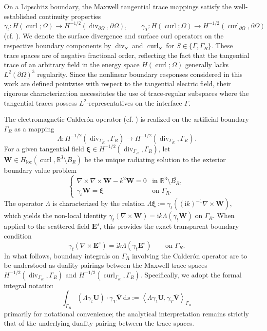 \documentclass[10pt,a4paper]{amsart}
\numberwithin{equation}{section}
\begin{document}
On a Lipschitz boundary, the Maxwell tangential trace mappings satisfy the well-established continuity properties
\[
\gamma_t \colon H(\operatorname{curl}; \Omega) \to H^{-1/2}(\operatorname{div}_{\partial\Omega}, \partial\Omega), \qquad \gamma_T \colon H(\operatorname{curl}; \Omega) \to H^{-1/2}(\operatorname{curl}_{\partial\Omega}, \partial\Omega)
\]
(cf. \cite{BuffaCostabelSheen2002}). We denote the surface divergence and surface curl operators on the respective boundary components by $\operatorname{div}_S$ and $\operatorname{curl}_S$ for $S \in \{\Gamma, \Gamma_R\}$. These trace spaces are of negative fractional order, reflecting the fact that the tangential trace of an arbitrary field in the energy space $H(\operatorname{curl}; \Omega)$ generally lacks $L^2(\partial\Omega)^3$ regularity. Since the nonlinear boundary responses considered in this work are defined pointwise with respect to the tangential electric field, their rigorous characterization necessitates the use of trace-regular subspaces where the tangential traces possess $L^2$-representatives on the interface $\Gamma$.


The electromagnetic Calder\'on operator (cf. \cite{KirschMonk1995, Monk2003}) is realized on the artificial boundary $\Gamma_R$ as a mapping 
\[
\Lambda \colon H^{-1/2}(\operatorname{div}_{\Gamma_R}, \Gamma_R) \to H^{-1/2}(\operatorname{div}_{\Gamma_R}, \Gamma_R).
\]
For a given tangential field $\boldsymbol{\xi} \in H^{-1/2}(\operatorname{div}_{\Gamma_R}, \Gamma_R)$, let $\mathbf{W} \in H_{\mathrm{loc}}(\operatorname{curl}, \mathbb{R}^3 \setminus \overline{B_R})$ be the unique radiating solution to the exterior boundary value problem
\[
\begin{cases}
\nabla \times \nabla \times \mathbf{W} - k^2 \mathbf{W} = 0 & \text{in } \mathbb{R}^3 \setminus \overline{B_R}, \\
\gamma_t \mathbf{W} = \boldsymbol{\xi} & \text{on } \Gamma_R.
\end{cases}
\]
The operator $\Lambda$ is characterized by the relation $\Lambda \boldsymbol{\xi} := \gamma_t((\mathrm{i}k)^{-1} \nabla \times \mathbf{W})$, which yields the non-local identity $\gamma_t(\nabla \times \mathbf{W}) = \mathrm{i}k \Lambda(\gamma_t \mathbf{W})$ on $\Gamma_R$. When applied to the scattered field $\mathbf{E}^s$, this provides the exact transparent boundary condition
\begin{equation}\label{eq:calderon_condition1}
\gamma_t(\nabla \times \mathbf{E}^s) = \mathrm{i}k \Lambda(\gamma_t \mathbf{E}^s) \qquad \text{on } \Gamma_R.
\end{equation}
In what follows, boundary integrals on $\Gamma_R$ involving the Calder\'on operator are to be understood as duality pairings between the Maxwell trace spaces $H^{-1/2}(\operatorname{div}_{\Gamma_R}, \Gamma_R)$ and $H^{-1/2}(\operatorname{curl}_{\Gamma_R}, \Gamma_R)$. Specifically, we adopt the formal integral notation
\[
\int_{\Gamma_R} (\Lambda \gamma_t \mathbf{U}) \cdot \gamma_T \overline{\mathbf{V}} \, \mathrm{d}s := \left\langle \Lambda \gamma_t \mathbf{U}, \gamma_T \overline{\mathbf{V}} \right\rangle_{\Gamma_R}
\]
primarily for notational convenience; the analytical interpretation remains strictly that of the underlying duality pairing between the trace spaces.
\end{document}
